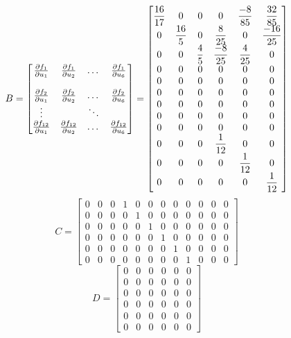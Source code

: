 \documentclass{article}
\begin{document}
\begin{equation}\label{eq:B}
B=
  \begin{bmatrix}
    \frac{\partial f_1}{\partial u_1} & \frac{\partial f_1}{\partial u_2} & \dots  & \frac{\partial f_1}{\partial u_6} \\ \\
    \frac{\partial f_2}{\partial u_1} & \frac{\partial f_2}{\partial u_2} & \dots  & \frac{\partial f_2}{\partial u_6} \\
    \vdots &  & \ddots  &  \\
    \frac{\partial f_{12}}{\partial u_1} & \frac{\partial f_{12}}{\partial u_2} & \dots  & \frac{\partial f_{12}}{\partial u_6}
  \end{bmatrix}=
  \setcounter{MaxMatrixCols}{20}
  \begin{bmatrix}
  \dfrac{16}{17} & 0 & 0 & 0 & \dfrac{-8}{85} & \dfrac{32}{85} \\
  0 & \dfrac{16}{5} & 0 & \dfrac{8}{25} & 0 & \dfrac{-16}{25} \\
  0 & 0 & \dfrac{4}{5} & \dfrac{-8}{25} & \dfrac{4}{25} & 0 \\
  0 & 0 & 0 & 0 & 0 & 0 \\
  0 & 0 & 0 & 0 & 0 & 0 \\
  0 & 0 & 0 & 0 & 0 & 0 \\
  0 & 0 & 0 & 0 & 0 & 0 \\
  0 & 0 & 0 & 0 & 0 & 0 \\
  0 & 0 & 0 & 0 & 0 & 0 \\
  0 & 0 & 0 & \dfrac{1}{12} & 0 & 0 \\
  0 & 0 & 0 & 0 & \dfrac{1}{12} & 0 \\
  0 & 0 & 0 & 0 & 0 & \dfrac{1}{12} 
  \end{bmatrix}
\end{equation}
\begin{equation}\label{eq:C}
C=
  \begin{bmatrix}
  0 & 0 & 0 & 1 & 0 & 0 & 0 & 0 & 0 & 0 & 0 & 0 \\ 
  0 & 0 & 0 & 0 & 1 & 0 & 0 & 0 & 0 & 0 & 0 & 0 \\ 
  0 & 0 & 0 & 0 & 0 & 1 & 0 & 0 & 0 & 0 & 0 & 0 \\
  0 & 0 & 0 & 0 & 0 & 0 & 1 & 0 & 0 & 0 & 0 & 0 \\ 
  0 & 0 & 0 & 0 & 0 & 0 & 0 & 1 & 0 & 0 & 0 & 0 \\ 
  0 & 0 & 0 & 0 & 0 & 0 & 0 & 0 & 1 & 0 & 0 & 0 
  \end{bmatrix}
\end{equation}  
\begin{equation}\label{eq:D}
D=
  \begin{bmatrix}
  0 & 0 & 0 & 0 & 0 & 0 \\
  0 & 0 & 0 & 0 & 0 & 0 \\
  0 & 0 & 0 & 0 & 0 & 0 \\
  0 & 0 & 0 & 0 & 0 & 0 \\
  0 & 0 & 0 & 0 & 0 & 0 \\
  0 & 0 & 0 & 0 & 0 & 0 
  \end{bmatrix}
\end{equation}
\end{document}
